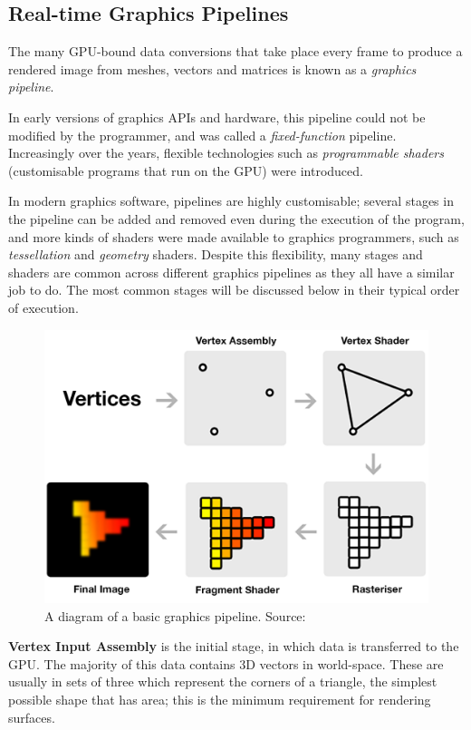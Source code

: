 \documentclass[11pt, a4paper, twocolumn]{article}
\begin{document}
\subsection{Real-time Graphics Pipelines}

The many GPU-bound data conversions that take place every frame to produce a rendered image from meshes, vectors and matrices is known as a \emph{graphics pipeline}.

In early versions of graphics APIs and hardware, this pipeline could not be modified by the programmer, and was called a \emph{fixed-function} pipeline. Increasingly over the years, flexible technologies such as \emph{programmable shaders} (customisable programs that run on the GPU) were introduced.

In modern graphics software, pipelines are highly customisable; several stages in the pipeline can be added and removed even during the execution of the program, and more kinds of shaders were made available to graphics programmers, such as \emph{tessellation} and \emph{geometry} shaders. Despite this flexibility, many stages and shaders are common across different graphics pipelines as they all have a similar job to do. The most common stages will be discussed below in their typical order of execution.

\begin{figure}[h]
\includegraphics[width=\linewidth]{pipeline}
\caption{A diagram of a basic graphics pipeline. Source: \citet{PipelineImage}}
\label{fig:pipeline}
\end{figure}

\textbf{Vertex Input Assembly} is the initial stage, in which data is transferred to the GPU. The majority of this data contains 3D vectors in world-space. These are usually in sets of three which represent the corners of a triangle, the simplest possible shape that has area; this is the minimum requirement for rendering surfaces.
\end{document}

